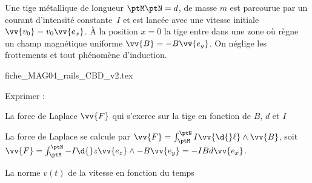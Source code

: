 \hauteurLargeurCadreReponse		{10mm}{3cm}
\initialisationEntrainement

\debutEntrainement

Une tige métallique de longueur $\ptM\ptN=d$, de masse $m$ est parcourue par un courant d'intensité constante~$I$ et est lancée avec une vitesse initiale $\vv{v_0}=v_0\vv{e_x}$. À la position $x=0$ la tige entre dans une zone où règne un champ magnétique uniforme $\vv{B}=-B\vv{e_y}$. On néglige les frottements et tout phénomène d'induction.

\begin{center}
{fiche_MAG04_rails_CBD_v2.tex}
\end{center}


Exprimer : 

\minusSmallskip

\begin{enonce}
La force de Laplace $\vv{F}$ qui s'exerce sur la tige en fonction de $B$, $d$ et $I$
\end{enonce}


\begin{corrige}
La force de Laplace se calcule par $\vv{F}=\int_\ptM^\ptN I\vv{\d{}\ell}\land\vv{B}$, soit $\vv{F}=\int_\ptM^\ptN -I\d{}z\vv{e_z}\land-B\vv{e_y} = -IBd\vv{e_x}$.
\end{corrige}

\begin{enonce}
La norme $v(t)$ de la vitesse en fonction du temps
\end{enonce}

